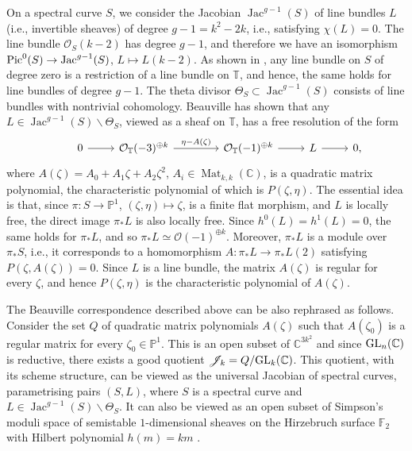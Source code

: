\documentclass[pdftex]{sigma}
\newcommand{\cx}{{\mathbb C}}
\newcommand{\Jac}{\operatorname{Jac}}
\newcommand{\Mat}{\operatorname{Mat}}
\numberwithin{equation}{section}
\newcommand{\oF}{{\mathbb{F}}}
\newcommand{\oP}{{\mathbb{P}}}
\newcommand{\oT}{{\mathbb{T}}}
\newcommand{\sO}{{\mathcal{O}}}
\begin{document}
On a spectral curve $S$, we consider the Jacobian $\Jac^{g-1}(S)$ of line bundles $L$ (i.e.,  invertible sheaves) of degree $g-1=k^2-2k$, i.e., satisfying $\chi(L)=0$. The line bundle $\sO_S(k-2)$ has degree $g-1$, and therefore we have an isomorphism ${\rm Pic}^0(S)\to \Jac^{g-1}(S)$, $L\mapsto L(k-2)$.
As shown in \cite[Proposition~2.1]{AHH}, any line bundle on $S$ of degree zero is a restriction of a line bundle on $\oT$, and hence, the same holds for line bundles of degree $g-1$. The theta divisor $\Theta_S\subset \Jac^{g-1}(S)$ consists of line bundles with nontrivial cohomology. Beauville \cite{Beau} has shown that any $L\in \Jac^{g-1}(S)\backslash \Theta_S$, viewed as a sheaf on $\oT$, has a free resolution of the form
\begin{equation}
\begin{tikzcd}
& 0 \ar[r] &\sO_\oT(-3)^{\oplus k}\ar[r,"\eta-A(\zeta)"] &[6mm] \sO_\oT(-1)^{\oplus k}\ar[r]& L\ar[r] & 0,
\end{tikzcd}\label{res}
\end{equation}
where $A(\zeta)=A_0+A_1\zeta+A_2\zeta^2$, $A_i\in \Mat_{k,k}(\cx)$, is a quadratic matrix polynomial, the characteristic polynomial of which is $P(\zeta,\eta)$. The essential idea is that, since $\pi\colon S\to\oP^1$, $(\zeta,\eta)\mapsto\zeta$, is a finite flat morphism, and $L$ is locally free, the direct image $\pi_\ast L$ is also locally free. Since $h^0(L)=h^1(L)=0$, the same holds for $\pi_\ast L$, and so $\pi_\ast L\simeq \sO(-1)^{\oplus k}$. Moreover, $\pi_\ast L$ is a module over $\pi_\ast S$, i.e., it corresponds to a homomorphism $A\colon \pi_\ast L\to \pi_\ast L(2)$ satisfying $P(\zeta,A(\zeta))=0$. Since $L$ is a line bundle, the matrix $A(\zeta)$ is regular for every $\zeta$, and hence $P(\zeta,\eta)$ is the characteristic polynomial of $A(\zeta)$.


\begin{Remark}
The Beauville correspondence described above can be also rephrased as follows. Consider the set $Q$ of quadratic matrix polynomials $A(\zeta)$ such that $A(\zeta_0)$ is a regular matrix for every $\zeta_0\in\oP^1$. This is an open subset of $\cx^{3k^2}$ and since ${\rm GL}_n(\cx)$ is reductive, there exists a good quotient $\mathscr{J}_k=Q/{\rm GL}_k(\cx)$. This quotient, with its scheme structure, can be viewed as the universal Jacobian of spectral curves, parametrising pairs $(S,L)$, where $S$ is a spectral curve and $L\in \Jac^{g-1}(S)\backslash \Theta_S$. It can also be viewed as an open subset of Simpson's moduli space of semistable $1$-dimensional sheaves on the Hirzebruch surface $\oF_2$ with Hilbert polynomial $h(m)=km$ \cite{Simp}. \label{moduli}
\end{Remark}
\end{document}
